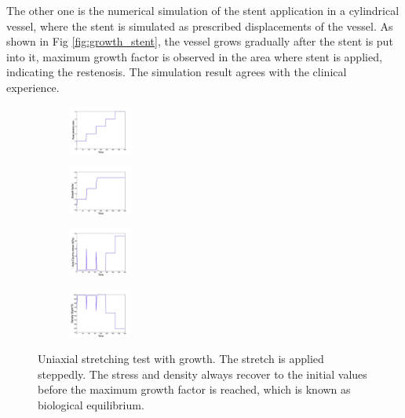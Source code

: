 \documentclass[12pt]{article}
\begin{document}
The other one is the numerical simulation of the stent application in a cylindrical vessel, where the stent is simulated as prescribed displacements of the vessel. As shown in Fig \ref{fig:growth_stent}, the vessel grows gradually after the stent is put into it, maximum growth factor is observed in the area where stent is applied, indicating the restenosis. The simulation result agrees with the clinical experience.

\begin{figure}[H]
	\centering
	\begin{subfigure}
		\centering
		\includegraphics[trim = {0.8cm, 0.0cm, 1.5cm, 1.5cm}, clip, width = 0.23\textwidth]{./figs/stretch1.jpg}
	\end{subfigure}
	\begin{subfigure}
		\centering
		\includegraphics[trim = {0.8cm, 0.0cm, 1.5cm, 1.5cm}, clip, width = 0.23\textwidth]{./figs/stretch2.jpg}
	\end{subfigure}
	\begin{subfigure}
		\centering
		\includegraphics[trim = {0.8cm, 0.0cm, 1.5cm, 1.5cm}, clip, width = 0.23\textwidth]{./figs/stretch3.jpg}
	\end{subfigure}
	\begin{subfigure}
		\centering
		\includegraphics[trim = {0.8cm, 0.0cm, 1.5cm, 1.5cm}, clip, width = 0.23\textwidth]{./figs/stretch4.jpg}
	\end{subfigure}
	\caption{Uniaxial stretching test with growth. The stretch is applied steppedly. The stress and density always recover to the initial values before the maximum growth factor is reached, which is known as biological equilibrium.}
	\label{fig:growth_results}
\end{figure}
\end{document}
